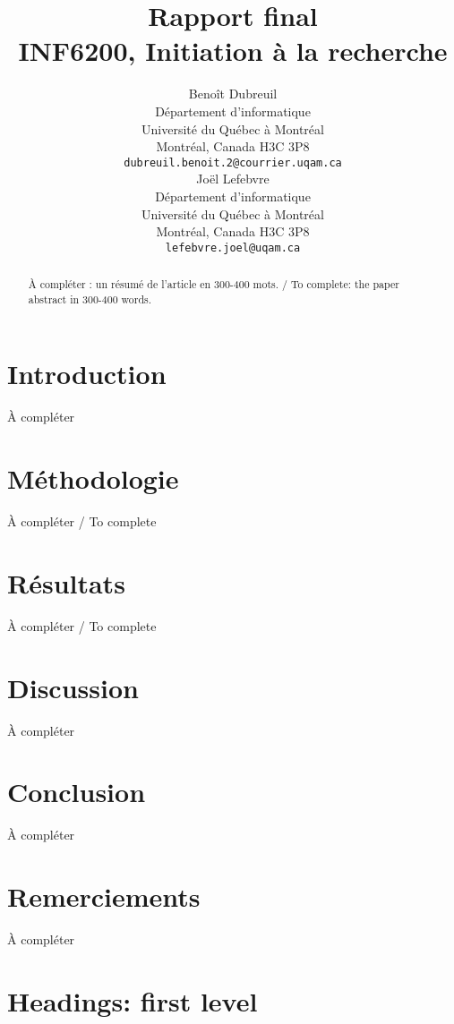 \documentclass{article}
\title{
  Rapport final \\
  INF6200, Initiation à la recherche}
\author{
  Benoît Dubreuil \\
  Département d'informatique \\ %
  Université du Québec à Montréal \\
  Montréal, Canada H3C 3P8 \\
  \texttt{dubreuil.benoit.2@courrier.uqam.ca} \\
  \And
  Joël Lefebvre \\ %
  Département d'informatique\\
  Université du Québec à Montréal \\
  Montréal, Canada H3C 3P8\\
  \texttt{lefebvre.joel@uqam.ca} \\
}
\begin{document}
  \maketitle

  \begin{abstract}
    À compléter : un résumé de l'article en 300-400 mots. / To complete: the paper abstract in 300-400 words.
  \end{abstract}


  \section{Introduction}
  À compléter


  \section{Méthodologie}
  À compléter / To complete


  \section{Résultats}
  À compléter / To complete


  \section{Discussion}
  À compléter


  \section{Conclusion}
  À compléter

  \section*{Remerciements}
  À compléter

  
  




  \section{Headings: first level}
  \label{sec:headings}
\end{document}

